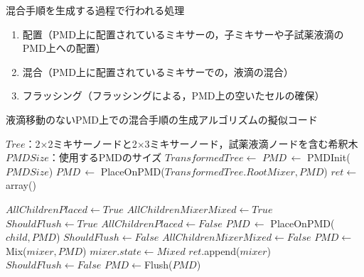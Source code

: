 \begin{itembox}[l]{混合手順を生成する過程で行われる処理}
\begin{enumerate}
    \item 配置（PMD上に配置されているミキサーの，子ミキサーや子試薬液滴のPMD上への配置）\label{place}
    \item 混合（PMD上に配置されているミキサーでの，液滴の混合）\label{mix}
    \item フラッシング（フラッシングによる，PMD上の空いたセルの確保）\label{flush}
\end{enumerate}
\end{itembox}


\begin{algorithm}[tbp]
 \caption{液滴移動のないPMD上での混合手順の生成アルゴリズムの擬似コード}\label{alg:genMixOrder}
 \begin{algorithmic}[1]
     \Require $\mathit{Tree}$：2$\times$2ミキサーノードと2$\times$3ミキサーノード，試薬液滴ノードを含む希釈木 
     \Require $\mathit{PMDSize}$：使用するPMDのサイズ
     \State $\mathit{TransformedTree} \gets$  
     \State $\mathit{PMD}\,\gets $  PMDInit($\mathit{PMDSize}$)
     \State $\mathit{PMD}\,\gets $  PlaceOnPMD($\mathit{TransformedTree.RootMixer,PMD}$)
     \State $\mathit{ret} \gets $array() 

    \State {}
        \State $\mathit{AllChildrenPlaced}\gets\mathit{True}$
        \State $\mathit{AllChildrenMixerMixed}\gets\mathit{True}$
        \State $\mathit{ShouldFlush}\gets\mathit{True}$
                \State$\mathit{AllChildrenPlaced \gets False}$
                \State $\mathit{PMD}\, \gets$  PlaceOnPMD($\mathit{child,PMD}$) 
                \State $\mathit{ShouldFlush}\gets\mathit{False}$
            \EndIf 
                \State $\mathit{AllChildrenMixerMixed}\gets\mathit{False}$
            \EndIf 
        \EndFor 
            \State$\mathit{PMD}\gets$Mix($\mathit{mixer,PMD}$)
            \State$\mathit{mixer.state} \gets \mathit{Mixed}$ 
            \State$\mathit{ret} $.append($\mathit{mixer}$) 
            \State $\mathit{ShouldFlush}\gets\mathit{False}$
        \EndIf
        \EndFor 
{}
                    \State $\mathit{PMD}\gets$Flush($\mathit{PMD}$)
                \EndIf
    \EndWhile 


\end{algorithmic}
\end{algorithm}
